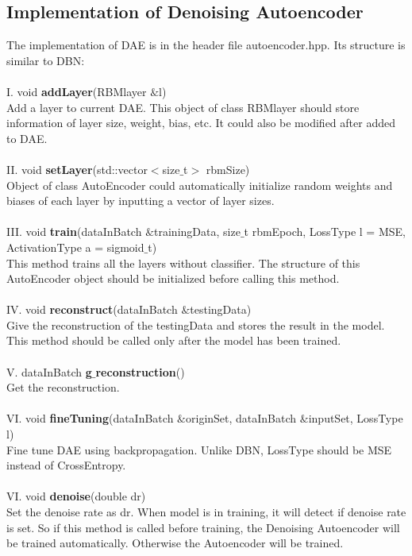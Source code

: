 \documentclass[12pt]{article}
\begin{document}
\subsection{Implementation of Denoising Autoencoder}
The implementation of DAE is in the header file autoencoder.hpp. Its structure is similar to DBN:\\
\\
I. void \textbf{addLayer}(RBMlayer $\&$l)\\
Add a layer to current DAE. This object of class RBMlayer should store information of layer size, weight, bias, etc. It could also be modified after added to DAE.\\
\\
II. void \textbf{setLayer}(std::vector$<$size$\_$t$>$ rbmSize)\\
Object of class AutoEncoder could automatically initialize random weights and biases of each layer by inputting a vector of layer sizes.\\
\\
III. void \textbf{train}(dataInBatch $\&$trainingData, size$\_$t rbmEpoch, LossType l = MSE, ActivationType a = sigmoid$\_$t)\\
This method trains all the layers without classifier. The structure of this AutoEncoder object should be initialized before calling this method. \\
\\
IV. void \textbf{reconstruct}(dataInBatch $\&$testingData)\\
Give the reconstruction of the testingData and stores the result in the model. This method should be called only after the model has been trained.\\
\\
V. dataInBatch \textbf{g$\_$reconstruction}()\\
Get the reconstruction.\\
\\
VI. void \textbf{fineTuning}(dataInBatch $\&$originSet, dataInBatch $\&$inputSet, LossType l)\\
Fine tune DAE using backpropagation. Unlike DBN, LossType should be MSE instead of CrossEntropy.\\
\\
VI. void \textbf{denoise}(double dr)\\
Set the denoise rate as dr. When model is in training, it will detect if denoise rate is set. So if this method is called before training, the Denoising Autoencoder will be trained automatically. Otherwise the Autoencoder will be trained.
\end{document}
